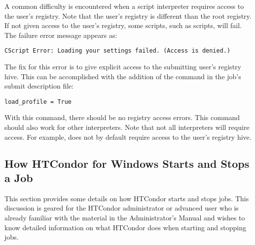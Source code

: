 A common difficulty is encountered when
a script interpreter requires access to the user's registry.
Note that the user's registry is different than the root registry.
If not given access to the user's registry,
some scripts, such as  scripts,
will fail.
The failure error message appears as: 

\begin{verbatim}
CScript Error: Loading your settings failed. (Access is denied.)
\end{verbatim}

The fix for this error is to give explicit access to the submitting
user's registry hive.  This can be accomplished with the addition of
the  command in the job's submit description
file:

\begin{verbatim}
load_profile = True
\end{verbatim}

With this command,
there should be no registry access errors.
This command should also work for other interpreters.
Note that not all interpreters will require access.
For example,
 does not by default require access to the user's
registry hive.

\subsection{How HTCondor for Windows Starts and Stops a Job}

This section provides some details on how HTCondor starts and stops jobs.
This discussion is geared for the HTCondor administrator or advanced user who is
already familiar with the material in the Administrator's Manual
and wishes to know detailed information on what HTCondor does when
starting and stopping jobs.

